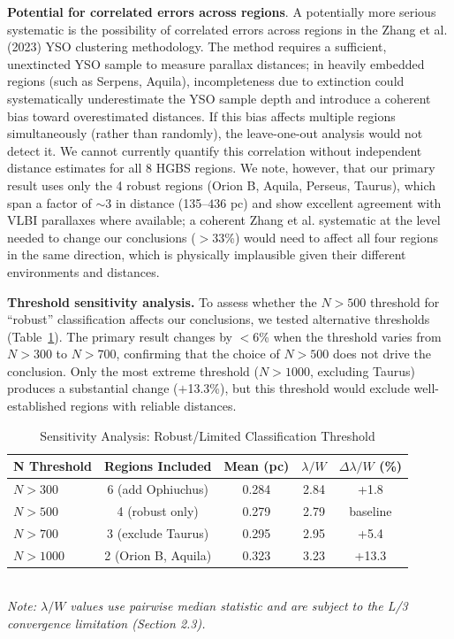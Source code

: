\documentclass[twocolumn]{mnras}
\begin{document}
\textbf{Potential for correlated errors across regions}. A potentially more serious systematic is the possibility of correlated errors across regions in the Zhang et al. (2023) YSO clustering methodology. The method requires a sufficient, unextincted YSO sample to measure parallax distances; in heavily embedded regions (such as Serpens, Aquila), incompleteness due to extinction could systematically underestimate the YSO sample depth and introduce a coherent bias toward overestimated distances. If this bias affects multiple regions simultaneously (rather than randomly), the leave-one-out analysis would not detect it. We cannot currently quantify this correlation without independent distance estimates for all 8 HGBS regions. We note, however, that our primary result uses only the 4 robust regions (Orion B, Aquila, Perseus, Taurus), which span a factor of $\sim$3 in distance (135--$436$ pc) and show excellent agreement with VLBI parallaxes where available; a coherent Zhang et al. systematic at the level needed to change our conclusions ($>33$\%) would need to affect all four regions in the same direction, which is physically implausible given their different environments and distances.

\textbf{Threshold sensitivity analysis.}
To assess whether the $N > 500$ threshold for ``robust'' classification affects our conclusions, we tested alternative thresholds (Table~\ref{tab:threshold_sensitivity}). The primary result changes by $<$6\% when the threshold varies from $N > 300$ to $N > 700$, confirming that the choice of $N > 500$ does not drive the conclusion. Only the most extreme threshold ($N > 1000$, excluding Taurus) produces a substantial change ($+$13.3\%), but this threshold would exclude well-established regions with reliable distances.

\begin{table}[h]
\caption{Sensitivity Analysis: Robust/Limited Classification Threshold}
\label{tab:threshold_sensitivity}
\begin{tabular}{lcccc}
\toprule
N Threshold & Regions Included & Mean (pc) & $\lambda/W$ & $\Delta\lambda/W$ (\%) \\
\midrule
$N > 300$    & 6 (add Ophiuchus) & 0.284 & 2.84 & +1.8 \\
$N > 500$    & 4 (robust only)   & 0.279 & 2.79 & baseline \\
$N > 700$    & 3 (exclude Taurus) & 0.295 & 2.95 & +5.4 \\
$N > 1000$   & 2 (Orion B, Aquila) & 0.323 & 3.23 & +13.3 \\
\bottomrule
\end{tabular}
\\
\footnotesize
\textit{Note: $\lambda/W$ values use pairwise median statistic and are subject to the L/3 convergence limitation (Section 2.3).}
\end{table}
\end{document}
